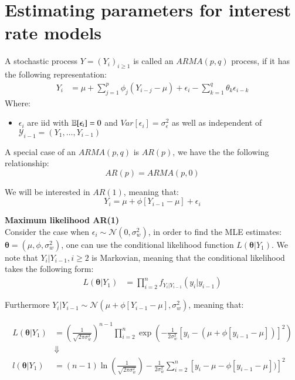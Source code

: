 \chapter{Estimating parameters for interest rate models} 

\begin{definition}
A stochastic process $Y = (Y_{i})_{i\geq 1}$ is called an $ARMA(p,q)$ process, if it has the following representation: 
\begin{align*}
Y_{i} &= \mu + \sum_{j=1}^{p}\phi_{j}(Y_{i-j}-\mu) + \epsilon_{i} - \sum_{k=1}^{q}\theta_{k}\epsilon_{i-k} \end{align*}
Where: 
\begin{itemize}[leftmargin =*]
    \item $\epsilon_{i}$ are iid with $\mathbb{E}[\epsilon_{i}] = 0$ and $Var[\epsilon_{i}] = \sigma_{\epsilon}^{2}$ as well as independent of \\ 
    $\mathcal{Y}_{i-1} = (Y_{1}, \dots, Y_{i-1})$
\end{itemize}
\end{definition}


A special case of an $ARMA(p,q)$ is $AR(p)$, we have the the following relationship: 
\[
AR(p) = ARMA(p,0)
\]

We will be interested in $AR(1)$, meaning that: 
\[
Y_{i} = \mu + \phi[Y_{i-1}-\mu] + \epsilon_{i}
\]

\textbf{Maximum likelihood AR(1)}
\\
Consider the case when $\epsilon_{i} \sim \mathcal{N}(0, \sigma_{w}^{2})$, in order to find the MLE estimates: $\bm{\theta} = (\mu, \phi, \sigma_{w}^{2})$, one can use the conditional likelihood function $L(\bm{\theta}|Y_{1})$. We note that $Y_{i}|Y_{i-1}, i \geq 2$ is Markovian, meaning that the conditional likelihood takes the following form: 
\begin{align*}
L(\bm{\theta}|Y_{1}) &= \prod_{i=2}^{n}f_{Y_{i}|Y_{i-1}}(y_{i}|y_{i-1})  
\end{align*}

Furthermore $Y_{i}|Y_{i-1} \sim \mathcal{N}(\mu + \phi[Y_{i-1}-\mu], \sigma_{w}^{2})$, meaning that: 

\begin{align*}
L(\bm{\theta}|Y_{1}) &= \left(
\frac{1}{
\sqrt{
2\pi\sigma_{w}^{2}
}
}
\right)^{n-1}\prod_{i=2}^{n}\exp\left(
-\frac{1}{2\sigma_{w}^{2}}\left[
y_{i}-(\mu + \phi[y_{i-1}-\mu])
\right]^{2}
\right) \\ 
&\Downarrow \\ 
l(\bm{\theta}|Y_{1}) &= 
(n-1)\ln\left(
\frac{1}{
\sqrt{
2\pi\sigma_{w}^{2}
}
}
\right)
-\frac{1}{2\sigma_{w}^{2}}
\sum_{i=2}^{n}
\left[
y_{i}-\mu - \phi[y_{i-1}-\mu])
\right]^{2}
\end{align*}

